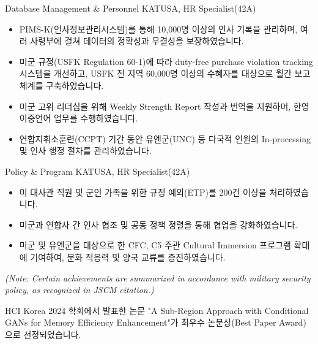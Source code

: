 \documentclass[10pt, a4paper]{cvhari}
\begin{document}
        \projectwo
        {Database Management \& Personnel}
        {KATUSA, HR Specialist(42A)}
        
        \begin{itemize}
            \item PIMS-K(인사정보관리시스템)를 통해 10,000명 이상의 인사 기록을 관리하며, 여러 사령부에 걸쳐 데이터의 정확성과 무결성을 보장하였습니다.
            \item 미군 규정(USFK Regulation 60-1)에 따라 duty-free purchase violation tracking 시스템을 개선하고, USFK 전 지역 60,000명 이상의 수혜자를 대상으로 월간 보고 체계를 구축하였습니다.
            \item 미군 고위 리더십을 위해 Weekly Strength Report 작성과 번역을 지원하며, 한영 이중언어 업무를 수행하였습니다.
            \item 연합지휘소훈련(CCPT) 기간 동안 유엔군(UNC) 등 다국적 인원의 In-processing 및 인사 행정 절차를 관리하였습니다.
        \end{itemize} 

        \projectwo
        {Policy \& Program}
        {KATUSA, HR Specialist(42A)}
        
        \begin{itemize}
            \item 미 대사관 직원 및 군인 가족을 위한 규정 예외(ETP)를 200건 이상을 처리하였습니다.
            \item 미군과 연합사 간 인사 협조 및 공동 정책 정렬을 통해 협업을 강화하였습니다.
            \item 미군 및 유엔군을 대상으로 한 CFC, C5 주관 Cultural Immersion 프로그램 확대에 기여하여, 문화 적응력 및 양국 교류를 증진하였습니다.
        \end{itemize} 

        \bigskip
        \smallskip
        \hfill {\scriptsize \textit{(Note: Certain achievements are summarized in accordance with military security policy, as recognized in JSCM citation.)}}
    

    
\medskip

    \bigskip
    
    {HCI Korea 2024 학회에서 발표한 논문 "A Sub-Region Approach with Conditional GANs for Memory Efficiency Enhancement"가 최우수 논문상(Best Paper Award)으로 선정되었습니다.}\par
    \smallskip 
    \divider
    \smallskip
    
\end{document}
